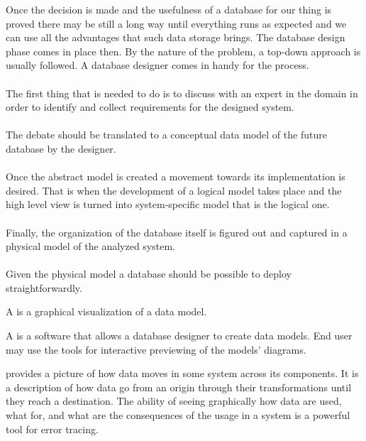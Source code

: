 \par
Once the decision is made and the usefulness of a database for our thing is proved there may be still a long way until everything runs as expected and we can use all the advantages that such data storage brings.
The database design phase comes in place then. By the nature of the problem, a top-down approach is usually followed.
A database designer comes in handy for the process. \\ \\
The first thing that is needed to do is to discuss with an expert in the domain  in order to identify and collect requirements for the designed system. \\ \\
The debate should be translated to a conceptual data model of the future database by the designer.\\ \\
Once the abstract model is created a movement towards its implementation is desired. That is when the development of a logical model takes place and the high level view is turned into system-specific model that is the logical one. \\ \\
Finally, the organization of the database itself is figured out and captured in a physical model of the analyzed system. \\ \\
Given the physical model a database should be possible to deploy straightforwardly. \\

\par 
A  is a graphical visualization of a data model. \\
\par
A  is a software that allows a database designer to create data models. End user may use the tools for interactive previewing of the models' diagrams. \\

\par
{} provides a picture of how data moves in some system across its components. It is a description of how data go from an origin through their transformations until they reach a destination. 
The ability of seeing graphically how data are used, what for, and what are the consequences of the usage in a system is a powerful tool for error tracing. \\

